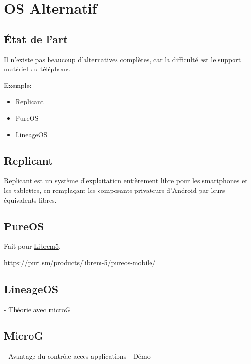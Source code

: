 \documentclass[aspectratio=169]{beamer}
\begin{document}

\section{OS Alternatif}

\begin{frame}
\begin{center}
\huge{\color{cvp}{OS Alternatif}}
\end{center}
\end{frame}

\subsection{État de l'art}
\begin{frame}
Il n'existe pas beaucoup d'alternatives complètes, car la difficulté est le support matériel du téléphone.

Exemple:
\begin{itemize}
	\item Replicant
	\item PureOS
	\item LineageOS
\end{itemize}
\end{frame}

\subsection{Replicant}
\begin{frame}
\href{https://fr.wikipedia.org/wiki/Replicant_\%28syst\%C3\%A8me_d\%27exploitation\%29}{Replicant} est un système d'exploitation entièrement libre pour les smartphones et les tablettes, en remplaçant les composants privateurs d'Android par leurs équivalents libres.
\end{frame}

\subsection{PureOS}
\begin{frame}
Fait pour \href{https://puri.sm/products/librem-5/}{Librem5}.\newline

\url{https://puri.sm/products/librem-5/pureos-mobile/}
\end{frame}

\subsection{LineageOS}
\begin{frame}
- Théorie avec microG
\end{frame}
\subsection{MicroG}
\begin{frame}
- Avantage du contrôle accès applications
- Démo
\end{frame}
\end{document}
